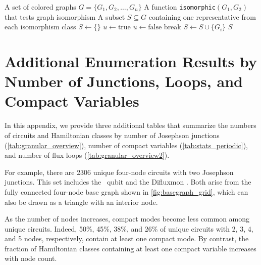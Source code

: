\begin{algorithm}[H]
\caption{Constructing a Nonisomorphic Set of Colored Graphs}
\label{alg:nonisomorphic}
\begin{algorithmic}
\Require A set of colored graphs $G = \{G_1, G_2, \dots, G_n\}$
\Require A function \texttt{isomorphic}$(G_1, G_2)$ that tests graph isomorphism
\Ensure A subset $S \subseteq G$ containing one representative from each isomorphism class
\State $S \gets \{\}$
    \State $u \gets \text{true}$
            \State $u \gets \text{false}$
            \State break
        \EndIf
    \EndFor
        \State $S \gets S\cup \{G_i\}$
    \EndIf
\EndFor
\State \Return $S$
\end{algorithmic}
\end{algorithm}



\section{Additional Enumeration Results by Number of Junctions, Loops, and Compact Variables}\label{app:additional_results}
In this appendix, we provide three additional tables that summarize the numbers of circuits and Hamiltonian classes by number of Josephson junctions (\cref{tab:granular_overview}),  number of compact variables (\cref{tab:stats_periodic}), and number of flux loops (\cref{tab:granular_overview2}).

For example, there are 2306 unique four-node circuits with two Josephson junctions. This set includes the \zp\ qubit \cite{gyenisMovingTransmonNoiseProtected2021b} and the Difluxmon \cite{garcia-azorin_2024}. Both arise from the fully connected four-node base graph shown in \cref{fig:basegraph_grid}, which can also be drawn as a triangle with an interior node.

As the number of nodes increases, compact modes become less common among unique circuits. Indeed, 50\%, 45\%, 38\%, and 26\% of unique circuits with 2, 3, 4, and 5 nodes, respectively, contain at least one compact mode. By contrast, the fraction of Hamiltonian classes containing at least one compact variable increases with node count.


